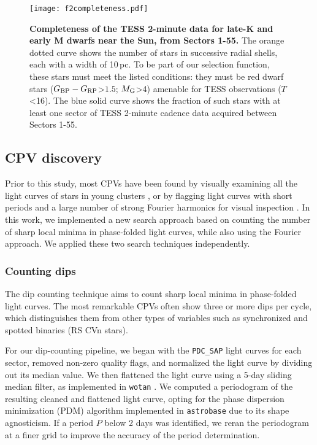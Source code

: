 \documentclass[11pt,twocolumn,tighten]{aastex63}
\newcommand{\bprp}{G_{\rm BP} - G_{\rm RP}}
\begin{document}
\begin{figure}[!t]
	\begin{center}
		\centering
		\texttt{[image: f2completeness.pdf]}
		\vspace{-0.2cm}
		\caption{
			{\bf Completeness of the TESS 2-minute data for late-K
      and early M dwarfs near the Sun, from Sectors 1-55.}  
      The orange dotted curve shows the number of stars in successive
      radial shells, each with a width of 10\,pc.  To be part of our selection function,
      these stars must meet the listed conditions: they must be red dwarf
      stars
      ($\bprp$>$1.5$; $M_{\rm G}$>4) amenable for TESS
      observations ($T$<16).  The blue solid curve shows the fraction
      of such stars with at least one sector of TESS 2-minute cadence
      data acquired between Sectors 1-55.
		}
			\vspace{-0.5cm}
		\label{fig:completeness}
	\end{center}
\end{figure}



\subsection{CPV discovery}
\label{subsec:discoverymethods}

Prior to this study, most CPVs have been found by visually examining
all the light curves of stars in young clusters
\citep{2016AJ....152..114R,2017AJ....153..152S,2023ApJ...945..114P},
or by flagging light curves with short periods and a large number of
strong Fourier harmonics for visual inspection
\citep{2019ApJ...876..127Z}.  In this work, we implemented a new
search approach based on counting the number of sharp local minima in
phase-folded light curves, while also using the Fourier approach.  We
applied these two search techniques independently.


\subsubsection{Counting dips}
\label{subsec:counting}

The dip counting technique aims to count sharp local minima in
phase-folded light curves.  The most remarkable CPVs often show three
or more dips per cycle, which distinguishes them from other types of
variables such as synchronized and spotted binaries (RS CVn stars).

For our dip-counting pipeline, we began with the {\tt PDC\_SAP} light
curves for each sector, removed non-zero quality flags, and normalized
the light curve by dividing out its median value.  We then flattened
the light curve using a 5-day sliding median filter, as implemented in
\texttt{wotan} \citep{2019AJ....158..143H}.  We computed a periodogram
of the resulting cleaned and flattened light curve, opting for the
\citet{1978ApJ...224..953S} phase dispersion minimization (PDM)
algorithm implemented in \texttt{astrobase}
\citep{2021zndo...1011188B} due to its shape agnosticism.  If a period
$P$ below 2 days was identified, we reran the periodogram at a finer
grid to improve the accuracy of the period determination.
\end{document}
